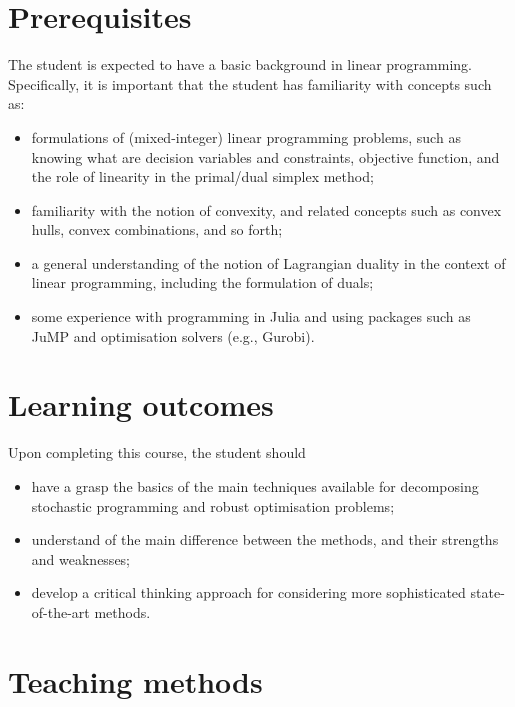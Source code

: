 \documentclass[a4paper]{artikel3}
\begin{document}
\vspace{-18pt}
\section{Prerequisites}

The student is expected to have a basic background in linear programming. Specifically, it is important that the student has familiarity with concepts such as:
\begin{itemize}
	\item formulations of (mixed-integer) linear programming problems, such as knowing what are decision variables and constraints, objective function, and the role of linearity in the primal/dual simplex method;
	\item familiarity with the notion of convexity, and related concepts such as convex hulls, convex combinations, and so forth;
	\item a general understanding of the notion of Lagrangian duality in the context of linear programming, including the formulation of duals;
	\item some experience with programming in Julia and using packages such as JuMP and optimisation solvers (e.g., Gurobi).	
\end{itemize}


\vspace{-18pt}
\section{Learning outcomes}

Upon completing this course, the student should  
\begin{itemize}
    \item have a grasp the basics of the main techniques available for decomposing stochastic programming and robust optimisation problems;
    \item understand of the main difference between the methods, and their strengths and weaknesses;
    \item develop a critical thinking approach for considering more sophisticated state-of-the-art methods. 
\end{itemize}

\pagebreak


\vspace{-18pt}
\section{Teaching methods}
\end{document}
